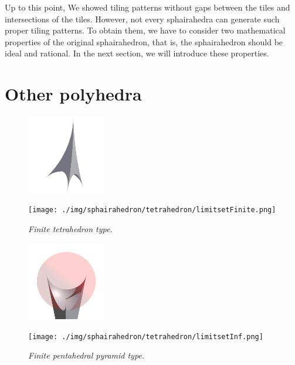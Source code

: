 \documentclass[dvipdfmx]{interact}
\theoremstyle{plain}%
\theoremstyle{definition}
\theoremstyle{remark}
\theoremstyle{problemstyle}
\begin{document}
Up to this point, We showed tiling patterns without gaps between the tiles and
intersections of the tiles.
However, not every sphairahedra can generate such proper tiling patterns.
To obtain them, we have to consider two mathematical properties
of the original sphairahedron, that is, the sphairahedron should be
ideal and rational.
In the next section, we will introduce these properties.

\section{Other polyhedra}

\begin{figure}[H]
 \begin{minipage}{0.5\textwidth}
  \begin{minipage}[t]{0.24\textwidth}
   \centering
   \includegraphics[width=1.35in, height=1.35in, keepaspectratio]{./img/sphairahedron/tetrahedron/sphairahedronFinite.png}
  \end{minipage}
  \hspace*{\fill}
  \begin{minipage}[t]{0.24\textwidth}
   \centering
   \texttt{[image: ./img/sphairahedron/tetrahedron/limitsetFinite.png]}
  \end{minipage}
  \hspace*{\fill}
  \caption{\textit{Finite tetrahedron type.}}
  \label{fig:tetrahedronFinite}
 \end{minipage}
 \hspace*{\fill}
 \begin{minipage}{0.5\textwidth}
  \begin{minipage}[t]{0.24\textwidth}
   \centering
   \includegraphics[width=1.35in, height=1.35in, keepaspectratio]{./img/sphairahedron/tetrahedron/sphairahedronInf.png}
  \end{minipage}
  \hspace*{\fill}
  \begin{minipage}[t]{0.24\textwidth}
   \centering
   \texttt{[image: ./img/sphairahedron/tetrahedron/limitsetInf.png]}
  \end{minipage}
  \hspace*{\fill}
  \caption{\textit{Finite pentahedral pyramid type.}}
  \label{fig:tetrahedronInf}
 \end{minipage}
\end{figure}
\end{document}
